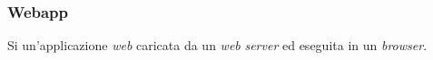 
\subsubsection*{Webapp}
Si un'applicazione \textit{web} caricata da un \textit{web} \textit{server} ed eseguita in un \textit{browser}.

\newpage
